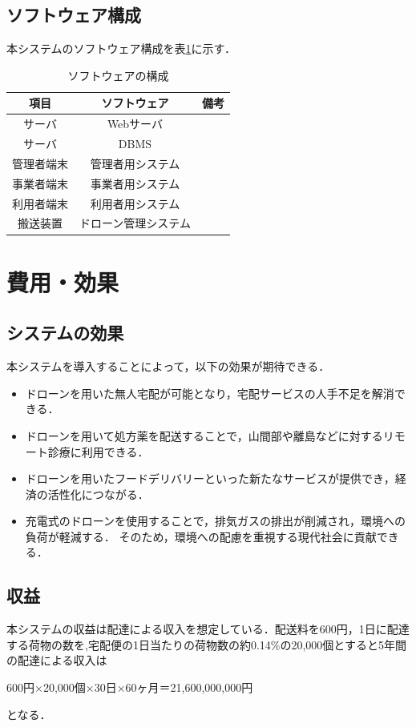 \documentclass[a4paper, titlepage]{jsarticle}
\begin{document}
\subsection{ソフトウェア構成}
本システムのソフトウェア構成を表\ref{fig:software}に示す．
\begin{table}[H]
  \begin{center}
    \caption{ソフトウェアの構成}
    \label{fig:software}
    \begin{tabular}{ccc} \hline
      項目           & ソフトウェア & 備考     \\ \hline \hline
      サーバ       & Webサーバ  &        \\
      サーバ & DBMS  &        \\
      管理者端末        & 管理者用システム &   \\
      事業者端末        & 事業者用システム &         \\
      利用者端末        & 利用者用システム & \\
      搬送装置         & ドローン管理システム &         \\ \hline
    \end{tabular}
  \end{center}
\end{table}

\section{費用・効果}
\subsection{システムの効果}
本システムを導入することによって，以下の効果が期待できる．
\begin{itemize}
\item ドローンを用いた無人宅配が可能となり，宅配サービスの人手不足を解消できる．
\item ドローンを用いて処方薬を配送することで，山間部や離島などに対するリモート診療に利用できる．
\item ドローンを用いたフードデリバリーといった新たなサービスが提供でき，経済の活性化につながる．
\item 充電式のドローンを使用することで，排気ガスの排出が削減され，環境への負荷が軽減する．
  そのため，環境への配慮を重視する現代社会に貢献できる．
\end{itemize}

\subsection{収益}
本システムの収益は配達による収入を想定している．配送料を600円，1日に配達する荷物の数を,宅配便の1日当たりの荷物数の約0.14\%の20,000個とすると5年間の配達による収入は
\begin{center}
  600円×20,000個×30日×60ヶ月＝21,600,000,000円
\end{center}
となる．
\end{document}
